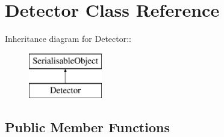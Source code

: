 \hypertarget{classDetector}{
\section{Detector Class Reference}
\label{classDetector}
}
Inheritance diagram for Detector::\begin{figure}[H]
\begin{center}
\leavevmode
\includegraphics[height=2cm]{classDetector}
\end{center}
\end{figure}
\subsection*{Public Member Functions}
